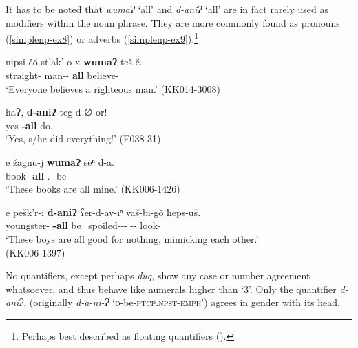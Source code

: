 It has to be noted that \textit{wumaɁ} `all' and \textit{d-aniɁ} `all' are in fact rarely used as modifiers within the noun phrase. They are more commonly found as pronouns (\ref{simplenp-ex8}) or adverbs (\ref{simplenp-ex9}).\footnote{Perhaps best described as floating quantifiers (\cite{gerdts1987quantfloat,miyagawa2006quantfloat}).}

\begin{exe}
	\ex\label{simplenp-ex8}
	\begin{xlist}
		\ex\label{simplenp-ex8a}
		\gll nipsi-č\u{o} st'ak'-o-x \textbf{wumaɁ} teš-\u{e}. \\
		straight-{\Obl} man-{\Obl}-{\Cont} \textbf{all} believe-{\Npst} \\
		\trans `Everyone believes a righteous man.'
		\hfill (KK014-3008)
		
		\ex\label{simplenp-ex8b}
		\gll haɁ, \textbf{d-aniɁ} teg-d-∅-or! \\
		yes \textbf{{\D}-all} do.{\Ipfv}-{\D}-{\Tr}-{{\Imprf}} \\
		\trans `Yes, s/he did everything!'
		\hfill (E038-31)
		
	\end{xlist}
\end{exe}

\begin{exe}
	\ex\label{simplenp-ex9}
	\begin{xlist}
		\ex\label{simplenp-ex9a}
		\gll e žagnu-j \textbf{wumaɁ} seⁿ d-a. \\
		{\Prox} book-{\Pl} \textbf{all} {\Fsg}.{\Gen} {\D}-be \\
		\trans `These books are all mine.'
		\hfill (KK006-1426)
		
		\ex\label{simplenp-ex9b}
		\gll e pešk'r-i \textbf{d-aniɁ} ʕer-d-av-iⁿ vaš-bi-g\u{o} ħeps-uš. \\
		{\Prox} youngster-{\Pl} \textbf{{\D}-all} be\_spoiled-{\D}-{\Lv}-{\Aor} {\Recp}-{\Pl}-{\All} look-{\Simul} \\
		\trans `These boys are all good for nothing, mimicking each other.' \\
		\hfill (KK006-1397)
		
	\end{xlist}
\end{exe}

No quantifiers, except perhaps \textit{duq}, show any case or number agreement whatsoever, and thus behave like numerals higher than `3'. Only the quantifier \textit{d-aniɁ}, (originally \textit{d-a-ni-Ɂ} `\textsc{d}-be-\textsc{ptcp.npst-emph}')  agrees in gender with its head.




